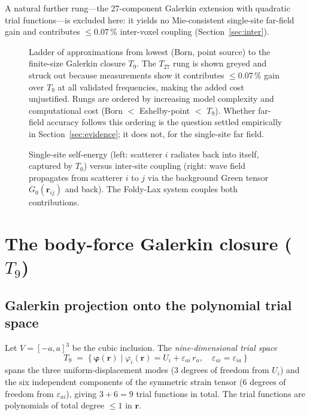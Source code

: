 \documentclass[11pt,a4paper]{article}
\newcommand{\br}{\bm{r}}
\newcommand{\bphi}{\bm{\varphi}}
\theoremstyle{plain}
\theoremstyle{definition}
\theoremstyle{remark}
\begin{document}
A natural further rung---the 27-component Galerkin extension with
quadratic trial functions---is excluded here: it yields no
Mie-consistent single-site far-field gain and contributes
$\le 0.07\,\%$ inter-voxel coupling (Section~\ref{sec:inter}).

\begin{figure}[h]
\centering

\caption{%
  Ladder of approximations from lowest (Born, point source) to the
  finite-size Galerkin closure $T_9$.  The $T_{27}$ rung is shown greyed and
  struck out because measurements show it contributes $\le 0.07\,\%$ gain over
  $T_9$ at all validated frequencies, making the added cost unjustified.
  Rungs are ordered by increasing model complexity and computational cost
  (Born $<$ Eshelby-point $<$ $T_9$).  Whether far-field accuracy follows
  this ordering is the question settled empirically in
  Section~\ref{sec:evidence}; it does not, for the single-site far field.%
}
\label{fig:ladder}
\end{figure}

\begin{figure}[h]
\centering

\caption{%
  Single-site self-energy (left: scatterer $i$ radiates back into itself,
  captured by $T_0$) versus inter-site coupling (right: wave field propagates
  from scatterer $i$ to $j$ via the background Green tensor $G_0(\br_{ij})$
  and back).  The Foldy-Lax system couples both contributions.%
}
\label{fig:single-vs-inter}
\end{figure}

\section{The body-force Galerkin closure (\texorpdfstring{$T_9$}{T9})}\label{sec:t9}

\subsection{Galerkin projection onto the polynomial trial space}
\label{sec:t9-galerkin}

Let $V = [-a,a]^{3}$ be the cubic inclusion.  The \emph{nine-dimensional
trial space}
\begin{equation}
  T_9 \;=\; \bigl\{\,\bphi(\br) \;\big|\;
  \varphi_i(\br) = U_i + \varepsilon_{ai}\,r_a,\quad
  \varepsilon_{ai} = \varepsilon_{ia}\,\bigr\}
  \label{eq:T9-def}
\end{equation}
spans the three uniform-displacement modes ($3$ degrees of freedom from
$U_i$) and the six independent components of the symmetric strain tensor
($6$ degrees of freedom from $\varepsilon_{ai}$), giving $3+6=9$ trial
functions in total.  The trial functions are polynomials of total degree
$\le 1$ in $\br$.
\end{document}
